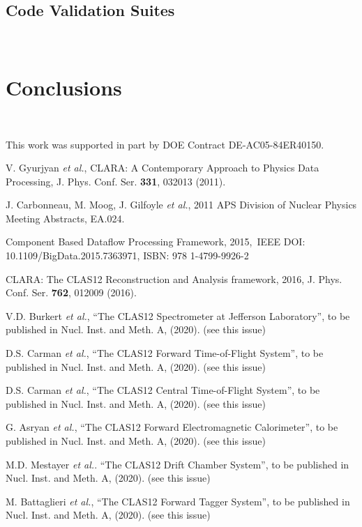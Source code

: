 \documentclass{elsart}
\begin{document}
\subsection{Code Validation Suites}
~~

\section{Conclusions}
~~

\ack

This work was supported in part by DOE Contract DE-AC05-84ER40150.

\begin{thebibliography}{99}

V. Gyurjyan {\it et al.}, CLARA: A Contemporary Approach to Physics Data Processing, J. Phys. Conf. Ser.
{\bf 331}, 032013 (2011).

J. Carbonneau, M. Moog,  J. Gilfoyle {\it et al.}, 2011 APS Division of Nuclear Physics Meeting Abstracts, EA.024.

  Component Based Dataflow Processing Framework, 2015, IEEE DOI: 10.1109/BigData.2015.7363971,
  ISBN: 978 1-4799-9926-2

CLARA: The CLAS12 Reconstruction and Analysis framework, 2016, J. Phys. Conf. Ser. {\bf 762}, 012009 (2016).

V.D. Burkert {\it et al.}, ``The CLAS12 Spectrometer at Jefferson Laboratory'', to be published in Nucl.
Inst. and Meth. A, (2020). (see this issue)

D.S. Carman {\it et al.},   ``The CLAS12 Forward Time-of-Flight System'', to be published in Nucl.
Inst. and Meth. A, (2020). (see this issue)

D.S. Carman {\it et al.}, ``The CLAS12 Central Time-of-Flight System'', to be published in Nucl.
Inst. and Meth. A, (2020). (see this issue)

G. Asryan {\it et al.}, ``The CLAS12 Forward Electromagnetic Calorimeter'', to be published in Nucl.
Inst. and Meth. A, (2020). (see this issue)

M.D. Mestayer {\it et al.}. ``The CLAS12 Drift Chamber System'', to be published in Nucl. Inst. and
Meth. A, (2020). (see this issue)

M. Battaglieri {\it et al.}, ``The CLAS12 Forward Tagger System'', to be published in Nucl. Inst. and
Meth. A, (2020). (see this issue)


\end{thebibliography}
\end{document}
